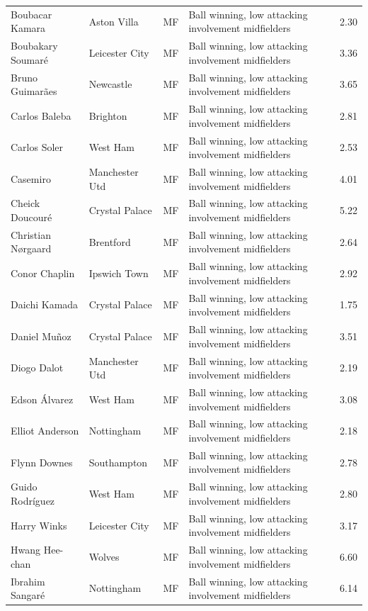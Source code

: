 \begin{longtable}{p{3.4cm}p{2.5cm}p{1.0cm}p{5.0cm}r}
Boubacar Kamara & Aston Villa & MF & Ball winning, low attacking involvement midfielders & 2.30 \\
Boubakary Soumaré & Leicester City & MF & Ball winning, low attacking involvement midfielders & 3.36 \\
Bruno Guimarães & Newcastle & MF & Ball winning, low attacking involvement midfielders & 3.65 \\
Carlos Baleba & Brighton & MF & Ball winning, low attacking involvement midfielders & 2.81 \\
Carlos Soler & West Ham & MF & Ball winning, low attacking involvement midfielders & 2.53 \\
Casemiro & Manchester Utd & MF & Ball winning, low attacking involvement midfielders & 4.01 \\
Cheick Doucouré & Crystal Palace & MF & Ball winning, low attacking involvement midfielders & 5.22 \\
Christian Nørgaard & Brentford & MF & Ball winning, low attacking involvement midfielders & 2.64 \\
Conor Chaplin & Ipswich Town & MF & Ball winning, low attacking involvement midfielders & 2.92 \\
Daichi Kamada & Crystal Palace & MF & Ball winning, low attacking involvement midfielders & 1.75 \\
Daniel Muñoz & Crystal Palace & MF & Ball winning, low attacking involvement midfielders & 3.51 \\
Diogo Dalot & Manchester Utd & MF & Ball winning, low attacking involvement midfielders & 2.19 \\
Edson Álvarez & West Ham & MF & Ball winning, low attacking involvement midfielders & 3.08 \\
Elliot Anderson & Nottingham & MF & Ball winning, low attacking involvement midfielders & 2.18 \\
Flynn Downes & Southampton & MF & Ball winning, low attacking involvement midfielders & 2.78 \\
Guido Rodríguez & West Ham & MF & Ball winning, low attacking involvement midfielders & 2.80 \\
Harry Winks & Leicester City & MF & Ball winning, low attacking involvement midfielders & 3.17 \\
Hwang Hee-chan & Wolves & MF & Ball winning, low attacking involvement midfielders & 6.60 \\
Ibrahim Sangaré & Nottingham & MF & Ball winning, low attacking involvement midfielders & 6.14 \\

\end{longtable}
